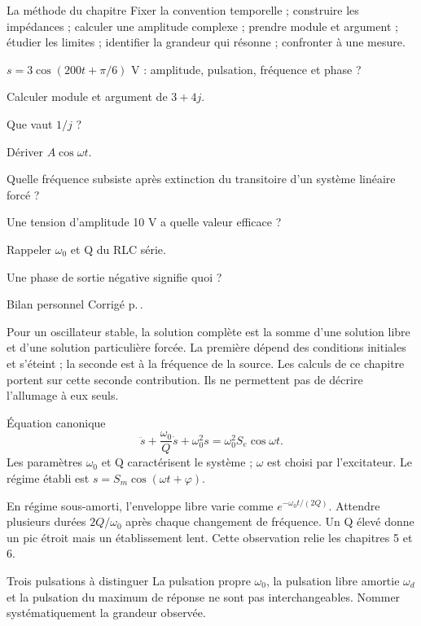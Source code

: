 \begin{methode}{La méthode du chapitre}
Fixer la convention temporelle ; construire les impédances ; calculer une amplitude complexe ; prendre module et argument ; étudier les limites ; identifier la grandeur qui résonne ; confronter à une mesure.
\end{methode}


\begin{questions}
\item $s=3\cos(200t+\pi/6)$ V : amplitude, pulsation, fréquence et phase ?
\item Calculer module et argument de $3+4j$.
\item Que vaut $1/j$ ?
\item Dériver $A\cos\omega t$.
\item Quelle fréquence subsiste après extinction du transitoire d’un système linéaire forcé ?
\item Une tension d’amplitude 10 V a quelle valeur efficace ?
\item Rappeler $\omega_0$ et Q du RLC série.
\item Une phase de sortie négative signifie quoi ?
\end{questions}
\begin{docu}{Bilan personnel}
Corrigé p.\,\pageref{corr-diag}.
\end{docu}


Pour un oscillateur stable, la solution complète est la somme d’une solution libre et d’une solution particulière forcée. La première dépend des conditions initiales et s’éteint ; la seconde est à la fréquence de la source. Les calculs de ce chapitre portent sur cette seconde contribution. Ils ne permettent pas de décrire l’allumage à eux seuls.
\begin{loi}{Équation canonique}
\[\ddot s+\frac{\omega_0}{Q}\dot s+\omega_0^2s=\omega_0^2 S_e\cos\omega t.\]Les paramètres $\omega_0$ et Q caractérisent le système ; $\omega$ est choisi par l’excitateur. Le régime établi est $s=S_m\cos(\omega t+\varphi)$.
\end{loi}
En régime sous-amorti, l’enveloppe libre varie comme $e^{-\omega_0t/(2Q)}$. Attendre plusieurs durées $2Q/\omega_0$ après chaque changement de fréquence. Un Q élevé donne un pic étroit mais un établissement lent. Cette observation relie les chapitres 5 et 6.
\begin{piege}{Trois pulsations à distinguer}
La pulsation propre $\omega_0$, la pulsation libre amortie $\omega_d$ et la pulsation du maximum de réponse ne sont pas interchangeables. Nommer systématiquement la grandeur observée.
\end{piege}


